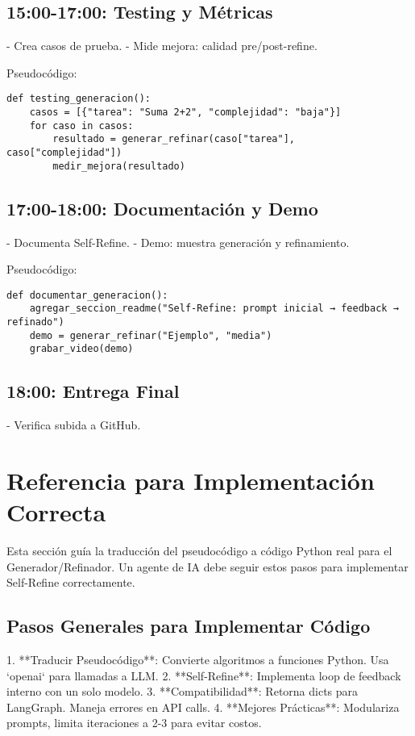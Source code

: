 \documentclass{article}
\begin{document}
\subsection{15:00-17:00: Testing y Métricas}
- Crea casos de prueba.
- Mide mejora: calidad pre/post-refine.

Pseudocódigo:
\begin{lstlisting}
def testing_generacion():
    casos = [{"tarea": "Suma 2+2", "complejidad": "baja"}]
    for caso in casos:
        resultado = generar_refinar(caso["tarea"], caso["complejidad"])
        medir_mejora(resultado)
\end{lstlisting}

\subsection{17:00-18:00: Documentación y Demo}
- Documenta Self-Refine.
- Demo: muestra generación y refinamiento.

Pseudocódigo:
\begin{lstlisting}
def documentar_generacion():
    agregar_seccion_readme("Self-Refine: prompt inicial → feedback → refinado")
    demo = generar_refinar("Ejemplo", "media")
    grabar_video(demo)
\end{lstlisting}

\subsection{18:00: Entrega Final}
- Verifica subida a GitHub.

\section{Referencia para Implementación Correcta}
Esta sección guía la traducción del pseudocódigo a código Python real para el Generador/Refinador. Un agente de IA debe seguir estos pasos para implementar Self-Refine correctamente.

\subsection{Pasos Generales para Implementar Código}
1. **Traducir Pseudocódigo**: Convierte algoritmos a funciones Python. Usa `openai` para llamadas a LLM.
2. **Self-Refine**: Implementa loop de feedback interno con un solo modelo.
3. **Compatibilidad**: Retorna dicts para LangGraph. Maneja errores en API calls.
4. **Mejores Prácticas**: Modulariza prompts, limita iteraciones a 2-3 para evitar costos.
\end{document}
